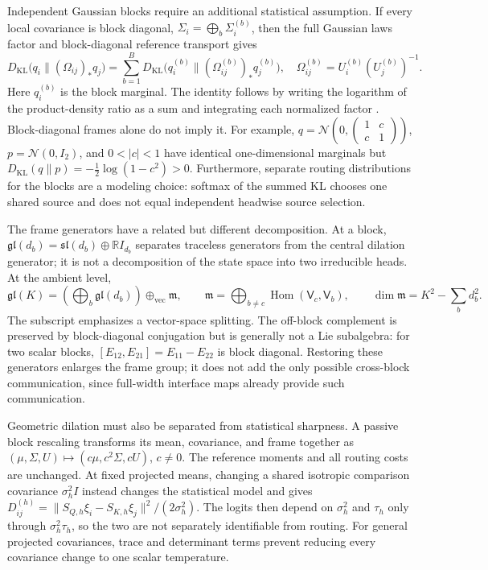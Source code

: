 \documentclass[twoside,11pt]{article}
\begin{document}
Independent Gaussian blocks require an additional statistical assumption. If every local covariance is block diagonal, $\Sigma_i=\bigoplus_b\Sigma_i^{(b)}$, then the full Gaussian laws factor and block-diagonal reference transport gives
\begin{equation}
D_{\mathrm{KL}}\bigl(q_i\|(\Omega_{ij})_*q_j\bigr)
=\sum_{b=1}^{B}D_{\mathrm{KL}}\bigl(q_i^{(b)}\|(\Omega_{ij}^{(b)})_*q_j^{(b)}\bigr),
\quad \Omega_{ij}^{(b)}=U_i^{(b)}(U_j^{(b)})^{-1}.
\label{eq:irrep_block_kl_additivity}
\end{equation}
Here $q_i^{(b)}$ is the block marginal. The identity follows by writing the logarithm of the product-density ratio as a sum and integrating each normalized factor \citep[Thm.~28]{vanErvenHarremoes2014}. Block-diagonal frames alone do not imply it. For example, $q=\mathcal N(0,\left(\begin{smallmatrix}1&c\\c&1\end{smallmatrix}\right))$, $p=\mathcal N(0,I_2)$, and $0<|c|<1$ have identical one-dimensional marginals but $D_{\mathrm{KL}}(q\|p)=-\tfrac12\log(1-c^2)>0$. Furthermore, separate routing distributions for the blocks are a modeling choice: softmax of the summed KL chooses one shared source and does not equal independent headwise source selection.

The frame generators have a related but different decomposition. At a block, $\mathfrak{gl}(d_b)=\mathfrak{sl}(d_b)\oplus\mathbb RI_{d_b}$ separates traceless generators from the central dilation generator; it is not a decomposition of the state space into two irreducible heads. At the ambient level,
\begin{equation}
\mathfrak{gl}(K)=\left(\bigoplus_b\mathfrak{gl}(d_b)\right)
\oplus_{\mathrm{vec}}\mathfrak m,\qquad
\mathfrak m=\bigoplus_{b\ne c}\operatorname{Hom}(\mathsf V_c,\mathsf V_b),\qquad
\dim\mathfrak m=K^2-\sum_bd_b^2.
\label{eq:off_block_vector_complement}
\end{equation}
The subscript emphasizes a vector-space splitting. The off-block complement is preserved by block-diagonal conjugation but is generally not a Lie subalgebra: for two scalar blocks, $[E_{12},E_{21}]=E_{11}-E_{22}$ is block diagonal. Restoring these generators enlarges the frame group; it does not add the only possible cross-block communication, since full-width interface maps already provide such communication.

Geometric dilation must also be separated from statistical sharpness. A passive block rescaling transforms its mean, covariance, and frame together as $(\mu,\Sigma,U)\mapsto(c\mu,c^2\Sigma,cU)$, $c\ne0$. The reference moments and all routing costs are unchanged. At fixed projected means, changing a shared isotropic comparison covariance $\sigma_h^2I$ instead changes the statistical model and gives $D_{ij}^{(h)}=\|S_{Q,h}\xi_i-S_{K,h}\xi_j\|^2/(2\sigma_h^2)$. The logits then depend on $\sigma_h^2$ and $\tau_h$ only through $\sigma_h^2\tau_h$, so the two are not separately identifiable from routing. For general projected covariances, trace and determinant terms prevent reducing every covariance change to one scalar temperature.
\end{document}
